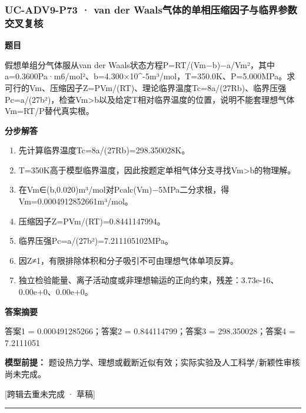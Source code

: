\documentclass[UTF8,11pt,a4paper]{ctexart}
\begin{document}
\subsubsection*{UC-ADV9-P73 · van der Waals气体的单相压缩因子与临界参数交叉复核}
\noindent\textbf{题目}\par
假想单组分气体服从van der Waals状态方程P=RT/(Vm−b)−a/Vm²，其中a=0.3600Pa·m6/mol²、b=4.300×10\textasciicircum{}-5m³/mol，T=350.0K、P=5.000MPa。求可行的Vm、压缩因子Z=PVm/(RT)、理论临界温度Tc=8a/(27Rb)、临界压强Pc=a/(27b²)，检查Vm>b以及给定T相对临界温度的位置，说明不能套理想气体Vm=RT/P替代真实根。\par
\medskip\noindent\textbf{分步解答}
\begin{enumerate}
\item 先计算临界温度Tc=8a/(27Rb)=298.350028K。
\item T=350K高于模型临界温度，因此按题定单相气体分支寻找Vm>b的物理解。
\item 在Vm∈(b,0.020)m³/mol对Pcalc(Vm)−5MPa二分求根，得Vm=0.0004912852661m³/mol。
\item 压缩因子Z=PVm/(RT)=0.8441147994。
\item 临界压强Pc=a/(27b²)=7.211105102MPa。
\item 因Z≠1，有限排除体积和分子吸引不可由理想气体单项反算。
\item 独立检验能量、离子活动度或非理想输运的正向约束，残差：3.73e-16、0.00e+0、0.00e+0。
\end{enumerate}
\noindent\textbf{答案摘要}\par
答案1 = 0.000491285266；答案2 = 0.844114799；答案3 = 298.350028；答案4 = 7.2111051\par
\noindent\textbf{模型前提：}
题设热力学、理想或截断近似有效；实际实验及人工科学/新颖性审核尚未完成。\par
\noindent\textcolor{red!65!black}{[跨辑去重未完成 · 草稿]} \par
\medskip\hrule\medskip
{}
\end{document}
